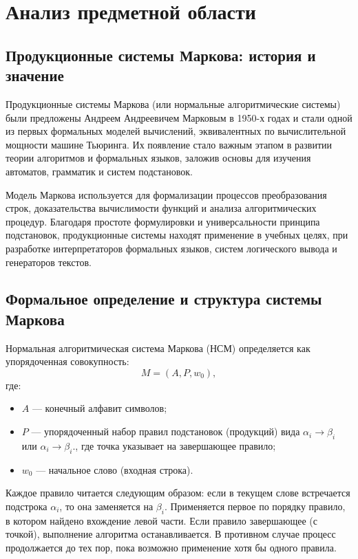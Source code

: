 \section{Анализ предметной области}

\subsection{Продукционные системы Маркова: история и значение}

Продукционные системы Маркова (или нормальные алгоритмические системы) были предложены Андреем Андреевичем Марковым в 1950-х годах и стали одной из первых формальных моделей вычислений, эквивалентных по вычислительной мощности машине Тьюринга. Их появление стало важным этапом в развитии теории алгоритмов и формальных языков, заложив основы для изучения автоматов, грамматик и систем подстановок.

Модель Маркова используется для формализации процессов преобразования строк, доказательства вычислимости функций и анализа алгоритмических процедур. Благодаря простоте формулировки и универсальности принципа подстановок, продукционные системы находят применение в учебных целях, при разработке интерпретаторов формальных языков, систем логического вывода и генераторов текстов.

\subsection{Формальное определение и структура системы Маркова}

Нормальная алгоритмическая система Маркова (НСМ) определяется как упорядоченная совокупность:
\[
M = (A, P, w_0),
\]
где:
\begin{itemize}
	\item \(A\) — конечный алфавит символов;
	\item \(P\) — упорядоченный набор правил подстановок (продукций) вида \( \alpha_i \rightarrow \beta_i \) или \( \alpha_i \rightarrow \beta_i. \), где точка указывает на завершающее правило;
	\item \(w_0\) — начальное слово (входная строка).
\end{itemize}

Каждое правило читается следующим образом: если в текущем слове встречается подстрока \( \alpha_i \), то она заменяется на \( \beta_i \). Применяется первое по порядку правило, в котором найдено вхождение левой части. Если правило завершающее (с точкой), выполнение алгоритма останавливается. В противном случае процесс продолжается до тех пор, пока возможно применение хотя бы одного правила.

